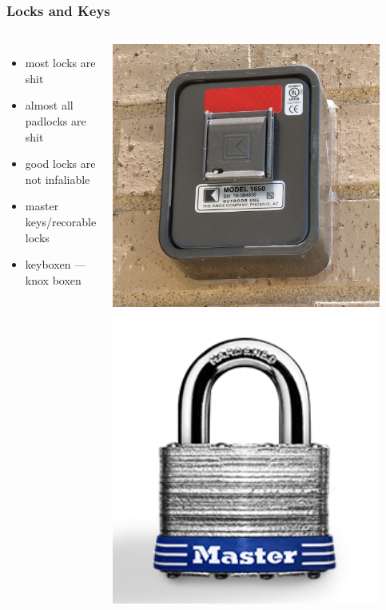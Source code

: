 \documentclass[]{beamer}
\begin{document}
\begin{frame}
  \frametitle{Locks and Keys}
  \begin{columns}[c]
    \column{0.5\textwidty}
    \begin{itemize}
      \item most locks are shit
      \item almost all padlocks are shit
      \item good locks are not infaliable
      \item master keys/recorable locks
      \item keyboxen --- knox boxen
    \end{itemize}
    \column{0.5\textwidty}
    \includegraphics[width=0.9\textwidth]{Knox-Box}
    \includegraphics[width=0.9\textwidth]{masterlock}

\end{columns}
\end{frame}
\end{document}
